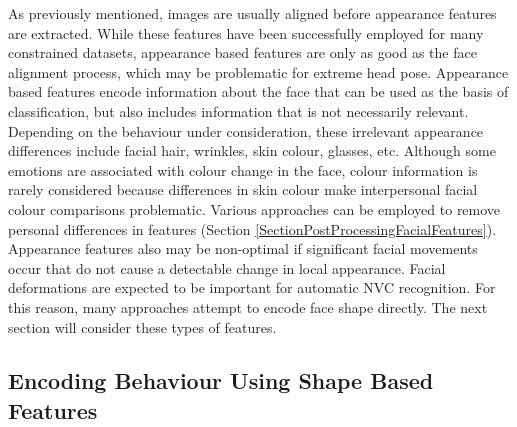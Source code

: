 As previously mentioned, images are usually aligned before appearance features are extracted. While these features have been successfully employed for many constrained datasets, appearance based features are only as good as the face alignment process, which may be problematic for extreme head pose. Appearance based features encode information about the face that can be used as the basis of classification, but also includes information that is not necessarily relevant. Depending on the behaviour under consideration, these irrelevant appearance differences include facial hair, wrinkles, skin colour, glasses, etc. Although some emotions are associated with colour change in the face, colour information is rarely considered because differences in skin colour make interpersonal facial colour comparisons problematic. Various approaches can be employed to remove personal differences in features (Section \ref{SectionPostProcessingFacialFeatures}). Appearance features also may be non-optimal if significant facial movements occur that do not cause a detectable change in local appearance. 
Facial deformations are expected to be important for automatic \ac{NVC} recognition. For this reason, many approaches attempt to encode face shape directly. The next section will consider these types of features.

\subsection{Encoding Behaviour Using Shape Based Features}
\label{BackgroundTemplateTracking}

